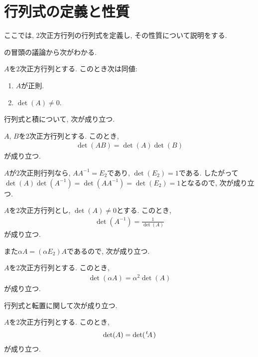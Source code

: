 \section{行列式の定義と性質}
ここでは, $2$次正方行列の行列式を定義し,
その性質について説明をする.

の冒頭の議論から次がわかる.
\begin{theorem}
  \label{thm:det:reg}
  $A$を$2$次正方行列とする.
  このとき次は同値:
  \begin{enumerate}
  \item $A$が正則.
  \item $\det(A)\neq 0$.
  \end{enumerate}
\end{theorem}

行列式と積について,
次が成り立つ.
\begin{theorem}
  \label{thm:det:hom}
  $A$, $B$を$2$次正方行列とする.
  このとき,
  \begin{align*}
   \det(AB)=\det(A)\det(B)
  \end{align*}
  が成り立つ.
\end{theorem}

$A$が$2$次正則行列なら, $AA^{-1}=E_2$であり, $\det(E_2)=1$である.
したがって$\det(A)\det(A^{-1})=\det(AA^{-1})=\det(E_2)=1$となるので,
次が成り立つ.
\begin{cor}
  $A$を$2$次正方行列とし, $\det(A)\neq 0$とする.
  このとき,
  \begin{align*}
   \det(A^{-1})=\frac{1}{\det(A)}
  \end{align*}
  が成り立つ.  
\end{cor}

また$\alpha A=(\alpha E_2) A$であるので, 次が成り立つ.
\begin{cor}
  \label{thm:det:scalar}
  $A$を$2$次正方行列とする.
  このとき,
  \begin{align*}
   \det(\alpha A)=\alpha^2 \det(A)
  \end{align*}
  が成り立つ.  
\end{cor}



行列式と転置に関して次が成り立つ.
\begin{theorem}
  \label{thm:det:transpose}
  $A$を$2$次正方行列とする.
  このとき,
  \begin{align*}
   \det(A)=\det({\left.^{t}\!A\right.})
  \end{align*}
  が成り立つ.  
\end{theorem}

